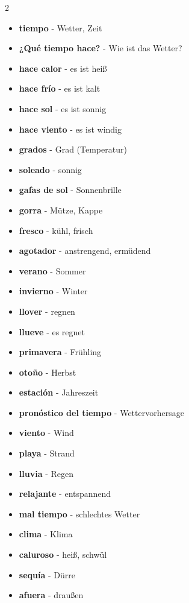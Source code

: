 \documentclass[12pt,a4paper]{article}
\begin{document}
\begin{multicols}{2}
\begin{itemize}[leftmargin=*]
    \item \textbf{tiempo} - Wetter, Zeit
    \item \textbf{¿Qué tiempo hace?} - Wie ist das Wetter?
    \item \textbf{hace calor} - es ist heiß
    \item \textbf{hace frío} - es ist kalt
    \item \textbf{hace sol} - es ist sonnig
    \item \textbf{hace viento} - es ist windig
    \item \textbf{grados} - Grad (Temperatur)
    \item \textbf{soleado} - sonnig
    \item \textbf{gafas de sol} - Sonnenbrille
    \item \textbf{gorra} - Mütze, Kappe
    \item \textbf{fresco} - kühl, frisch
    \item \textbf{agotador} - anstrengend, ermüdend
    \item \textbf{verano} - Sommer
    \item \textbf{invierno} - Winter
    \item \textbf{llover} - regnen
    \item \textbf{llueve} - es regnet
    \item \textbf{primavera} - Frühling
    \item \textbf{otoño} - Herbst
    \item \textbf{estación} - Jahreszeit
    \item \textbf{pronóstico del tiempo} - Wettervorhersage
    \item \textbf{viento} - Wind
    \item \textbf{playa} - Strand
    \item \textbf{lluvia} - Regen
    \item \textbf{relajante} - entspannend
    \item \textbf{mal tiempo} - schlechtes Wetter
    \item \textbf{clima} - Klima
    \item \textbf{caluroso} - heiß, schwül
    \item \textbf{sequía} - Dürre
    \item \textbf{afuera} - draußen
\end{itemize}
\end{multicols}
\end{document}
